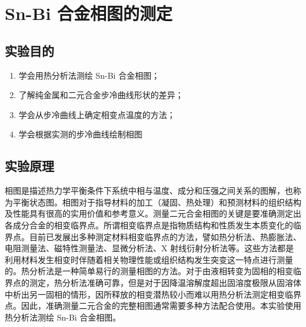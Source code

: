 \chapter{Sn-Bi 合金相图的测定}
\section{实验目的}
    \begin{enumerate}
        \item 学会用热分析法测绘 Sn-Bi 合金相图；
        \item 了解纯金属和二元合金步冷曲线形状的差异；
        \item 学会从步冷曲线上确定相变点温度的方法；
        \item 学会根据实测的步冷曲线绘制相图
    \end{enumerate}
\section{实验原理}%
    相图是描述热力学平衡条件下系统中相与温度、成分和压强之间关系的图解，也称为平衡状态图。相图对于指导材料的加工（凝固、热处理）和预测材料的组织结构及性能具有很高的实用价值和参考意义。测量二元合金相图的关键是要准确测定出各成分合金的相变临界点。所谓相变临界点是指物质结构和性质发生本质变化的临界点。目前已发展出多种测定材料相变临界点的方法，譬如热分析法、热膨胀法、电阻测量法、磁特性测量法、显微分析法、X 射线衍射分析法等。这些方法都是利用材料发生相变时伴随着相关物理性能或组织结构发生突变这一特点进行测量的。热分析法是一种简单易行的测量相图的方法。对于由液相转变为固相的相变临界点的测定，热分析法准确可靠，但是对于因降温溶解度超出固溶度极限从固溶体中析出另一固相的情形，因所释放的相变潜热较小而难以用热分析法测定相变临界点。因此，准确测量二元合金的完整相图通常需要多种方法配合使用。本实验使用热分析法测绘 Sn-Bi 合金相图。\par
